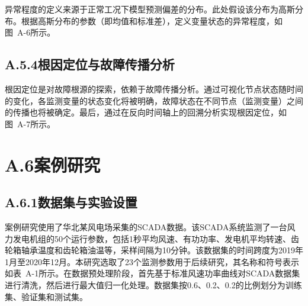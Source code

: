 
异常程度的定义来源于正常工况下模型预测偏差的分布。此处假设该分布为高斯分布。根据高斯分布的参数（即均值和标准差），定义变量状态的异常程度，如图~A-6所示。


\subsection*{A.5.4\quad 根因定位与故障传播分析}

根因定位是对故障根源的探索，依赖于故障传播分析。通过可视化节点状态随时间的变化，各监测变量的状态变化将被明确，故障状态在不同节点（监测变量）之间的传播也将被确定。最后，通过在反向时间轴上的回溯分析实现根因定位，如图~A-7所示。


\section*{A.6\quad 案例研究}

\subsection*{A.6.1\quad 数据集与实验设置}

案例研究使用了华北某风电场采集的SCADA数据。该SCADA系统监测了一台风力发电机组的50个运行参数，包括1秒平均风速、有功功率、发电机平均转速、齿轮箱轴承温度和齿轮箱油温等，采样间隔为10分钟。该数据集的时间跨度为2019年1月至2020年12月。本研究选取了23个监测参数用于后续研究，其名称和符号表示如表~A-1所示。在数据预处理阶段，首先基于标准风速功率曲线对SCADA数据集进行清洗，然后进行最大值归一化处理。数据集按0.6、0.2、0.2的比例划分为训练集、验证集和测试集。

